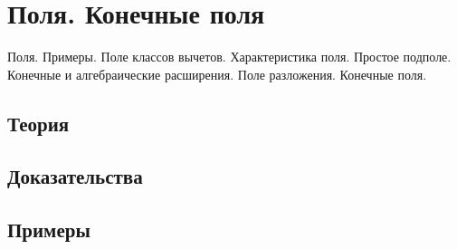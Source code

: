 
\section{Поля. Конечные поля}
\label{sec:2.2.15-fields-finite}

\begin{ticket}
Поля. Примеры. Поле классов вычетов. Характеристика поля. Простое подполе. Конечные и алгебраические расширения. Поле разложения. Конечные поля.
\end{ticket}

\subsection*{Теория}

\subsection*{Доказательства}

\subsection*{Примеры}
